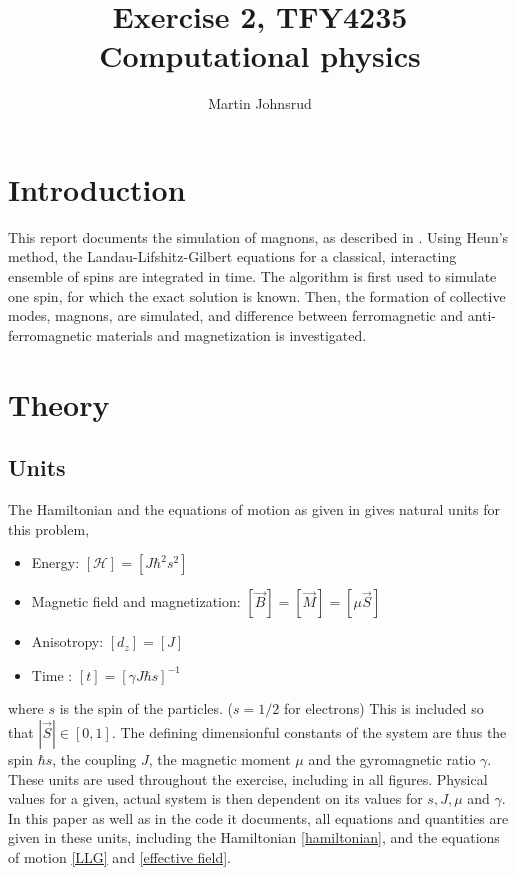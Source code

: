 \documentclass{article}
\title{Exercise 2, TFY4235 Computational physics}
\author{Martin Johnsrud}
\date{}
\begin{document}
    \maketitle
    \section*{Introduction}
    This report documents the simulation of magnons, as described in \cite{exercise}.
    Using Heun's method, the Landau-Lifshitz-Gilbert equations for a classical, interacting ensemble of spins are integrated in time.
    The algorithm is first used to simulate one spin, for which the exact solution is known.
    Then, the formation of collective modes, magnons, are simulated, and difference between ferromagnetic and anti-ferromagnetic materials and magnetization is investigated.

    \section*{Theory}
    \subsection*{Units}

    The Hamiltonian and the equations of motion as given in \cite{exercise} gives natural units for this problem,
    \begin{itemize}
        \item Energy: $[\mathcal H] = [J \hbar^2 s^2]$
        \item Magnetic field and magnetization: $[\vec B] = [\vec M] = [\mu \vec S ]$
        \item Anisotropy: $[d_z] = [J]$
        \item Time : $[t] = [\gamma J \hbar s]^{-1}$
    \end{itemize}
     where $s$ is the spin of the particles.
     ($s=1/2$ for electrons)
     This is included so that $|\vec S|\in[0, 1]$.
     The defining dimensionful constants of the system are thus the spin $\hbar s$, the coupling $J$, the magnetic moment $\mu$ and the gyromagnetic ratio $\gamma$.
     These units are used throughout the exercise, including in all figures.
     Physical values for a given, actual system is then dependent on its values for $s, J, \mu$ and $\gamma$.
     In this paper as well as in the code it documents, all equations and quantities are given in these units, including the Hamiltonian \autoref{hamiltonian}, and the equations of motion \autoref{LLG} and \autoref{effective field}.
\end{document}
